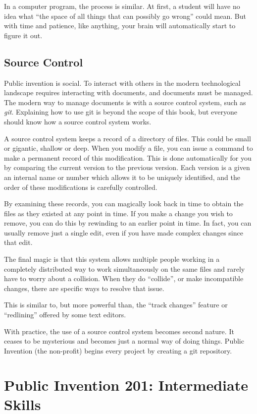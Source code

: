 \documentclass[
	fontsize=10pt, %
	twoside=false, %
	secnumdepth=1, %
]{kaobook}
\begin{document}
In a computer program, the process is similar. At first, a student will have no idea
what ``the space of all things that can possibly go wrong'' could mean. But with time and patience,
like anything, your brain will automatically start to figure it out.

\section{Source Control}

Public invention is social. To interact with others
in the modern technological landscape requires interacting
with documents, and documents must be managed.
The modern way to manage documents is with a source control
system, such as {\em git}. Explaining how to use git is beyond
the scope of this book, but everyone should know how a source control
system works.

A source control system keeps a record of a directory of files.
This could be small or gigantic, shallow or deep.
When you modify a file, you can issue a command to make a permanent
record of this modification. This is done automatically for you
by comparing the current version to the previous version.
Each version is a given an internal name or number which allows
it to be uniquely identified, and the order of these modifications
is carefully controlled.

By examining these records, you can magically look back in time
to obtain the files as they existed at any point in time.
If you make a change you wish to remove, you can do this by
rewinding to an earlier point in time.
In fact, you can usually remove just a single edit, even if
you have made complex changes since that edit.

The final magic is that this system allows multiple people
working in a completely distributed way to work simultaneously
on the same files and rarely have to worry about a collision.
When they do ``collide'', or make incompatible changes, there
are specific ways to resolve that issue.

This is similar to, but more powerful than, the ``track changes'' feature
or ``redlining'' offered by some text editors.

With practice, the use of a source control system becomes second nature.
It ceases to be mysterious and becomes just a normal way of doing things.
Public Invention (the non-profit) begins every project by creating a git repository.

\chapter{Public Invention 201: Intermediate Skills}
\end{document}
